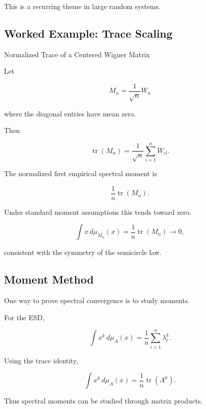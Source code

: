 This is a recurring theme in large random systems.

\subsection{Worked Example: Trace Scaling}
\label{subsec:worked-trace-wigner}

\begin{workedexamplebox}{Normalized Trace of a Centered Wigner Matrix}

Let

\[
M_n
=
\frac1{\sqrt{n}}W_n
\]

where the diagonal entries have mean zero.

Then

\[
\operatorname{tr}(M_n)
=
\frac1{\sqrt{n}}
\sum_{i=1}^{n}W_{ii}.
\]

The normalized first empirical spectral moment is

\[
\frac1n
\operatorname{tr}(M_n).
\]

Under standard moment assumptions this tends toward zero.

\begin{answerbox}
\[
\boxed{
\int x\,d\mu_{M_n}(x)
=
\frac1n\operatorname{tr}(M_n)
\to0,
}
\]

consistent with the symmetry of the semicircle law.
\end{answerbox}

\end{workedexamplebox}

\subsection{Moment Method}
\label{subsec:random-matrix-moment-method}

One way to prove spectral convergence is to study moments.

For the ESD,

\[
\int x^k\,d\mu_A(x)
=
\frac1n
\sum_{i=1}^{n}\lambda_i^k.
\]

Using the trace identity,

\[
\boxed{
\int x^k\,d\mu_A(x)
=
\frac1n
\operatorname{tr}(A^k).
}
\]

Thus spectral moments can be studied through matrix products.

